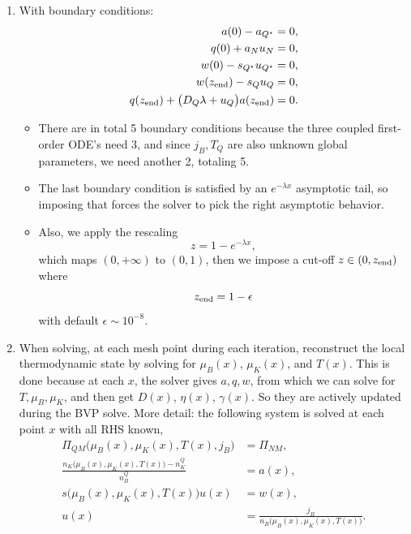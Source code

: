 \documentclass[11pt]{article}
\begin{document}
\begin{enumerate}
\begin{align}
\end{align}
In the code, the last equation is evaluated implicitly using the local thermodynamic closure $u=u(a,w)$ at each mesh point.
\item With boundary conditions:
\begin{align}
a(0)-a_{Q^\star} &= 0,\\
q(0)+a_Nu_N &= 0,\\
w(0)-s_{Q^\star}u_{Q^\star} &= 0,\\
w(z_{\rm end}) - s_Qu_Q &= 0,\\
q(z_{\rm end})+\bigl(D_Q\lambda+u_Q\bigr)a(z_{\rm end}) &= 0.
\end{align}
\begin{itemize}
    \item There are in total 5 boundary conditions because the three coupled first-order ODE's need 3, and since $j_B, T_Q$ are also unknown global parameters, we need another 2, totaling 5.
    \item The last boundary condition is satisfied by an $e^{-\lambda x}$ asymptotic tail, so imposing that forces the solver to pick the right asymptotic behavior.
    \item Also, we apply the rescaling
    \begin{equation}
    z = 1-e^{-\lambda x},
    \end{equation}
    which maps $(0,+\infty)$ to $(0,1)$, then we impose a cut-off $z\in(0,z_{\rm end})$ where
    \begin{equation}
    z_{\rm end} = 1-\epsilon
    \end{equation}
    with default $\epsilon \sim 10^{-8}$.
\end{itemize}
\item When solving, at each mesh point during each iteration, reconstruct the local thermodynamic state by solving for $\mu_B(x)$, $\mu_K(x)$, and $T(x)$. This is done because at each $x$, the solver gives $a,q,w$, from which we can solve for $T, \mu_B, \mu_K$, and then get $D(x)$, $\eta(x)$, $\gamma(x)$. So they are actively updated during the BVP solve. More detail: the following system is solved at each point $x$ with all RHS known,
\begin{align}
\Pi_{QM}\Big(\mu_B(x), \mu_K(x), T(x), j_B\Big) & = \Pi_{NM}, \\
\frac{n_K\Big(\mu_B(x), \mu_K(x), T(x)\Big) - n_K^Q}{n_B^Q} & =  a(x), \\
s\Big(\mu_B(x), \mu_K(x), T(x)\Big)u(x) & = w(x), \\
u(x) & = \frac{j_B}{n_B\Big(\mu_B(x), \mu_K(x), T(x)\Big)}.

\end{align}
\end{enumerate}
\end{document}
